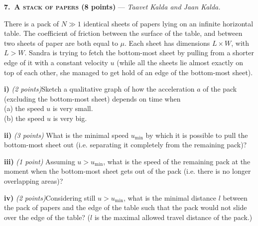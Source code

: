 \textbf{7.\ \textsc{A stack of papers} (8 points)} --- \textit{Taavet Kalda and Jaan Kalda.}

There is a pack of $N \gg 1$ identical sheets of papers lying on an infinite
horizontal table. The coefficient of friction between the surface of the table,
and between two sheets of paper are both equal to $\mu$. Each sheet has
dimensions $L \times W$, with $L > W$. Sandra is trying to fetch the
bottom-most sheet by pulling from a shorter edge of it with a constant velocity
$u$ (while all the sheets lie almost exactly on top of each other, she managed
to get hold of an edge of the bottom-most sheet).

\textbf{i)} \textit{(2 points)}Sketch a qualitative graph of how the
acceleration $a$ of the pack (excluding the bottom-most sheet) depends on time
when\\
(a) the speed $u$ is very small.\\
(b) the speed $u$ is very big.

\textbf{ii)} \textit{(3 points)} What is the minimal speed $u_{\min}$ by which
it is possible to pull the bottom-most sheet out (i.e. separating it completely
from the remaining pack)?

\textbf{iii)} \textit{(1 point)} Assuming $u > u_{\min}$, what is the speed of
the remaining pack at the moment when the bottom-most sheet gets out of the pack
(i.e. there is no longer overlapping areas)?

\textbf{iv)} \textit{(2 points)}Considering still $u > u_{\min}$, what is the
minimal distance $l$ between the pack of papers and the edge of the table such
that the pack would not slide over the edge of the table? ($l$ is the maximal
allowed travel distance of the pack.)
